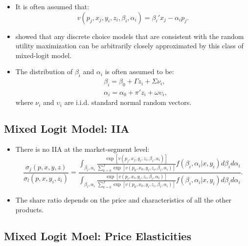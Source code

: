 \documentclass[
]{book}
\providecommand{\tightlist}{%
  \setlength{\itemsep}{0pt}\setlength{\parskip}{0pt}}
\begin{document}
\begin{itemize}
\tightlist
\item
  It is often assumed that:
  \begin{equation}
  v(p_j, x_j, y_i, z_i, \beta_i, \alpha_i) = \beta_i' x_j - \alpha_i p_j.
  \end{equation}
\item
  \citet{Mcfadden2000} showed that any discrete choice models that are consistent with the random utility maximization can be arbitrarily closely approximated by this class of mixed-logit model.
\item
  The distribution of \(\beta_i\) and \(\alpha_i\) is often assumed to be:
  \begin{equation}
  \begin{split}
  &\beta_i = \beta_0 + \Gamma z_i + \Sigma \nu_i,\\
  &\alpha_i = \alpha_0 + \pi' z_i + \omega \upsilon_i,
  \end{split}
  \end{equation}
  where \(\nu_i\) and \(\upsilon_i\) are i.i.d. standard normal random vectors.
\end{itemize}

\hypertarget{mixed-logit-model-iia}{%
\subsection{Mixed Logit Model: IIA}\label{mixed-logit-model-iia}}

\begin{itemize}
\tightlist
\item
  There is no IIA at the market-segment level:
  \begin{equation}
  \frac{\sigma_{j}(p, x, y, z)}{\sigma_{l}(p, x, y_i, z_i)} = \frac{\int_{\beta_i, \alpha_i} \frac{\exp[v(p_j, x_j, y_i, z_i, \beta_i, \alpha_i)]}{\sum_{k = 0}^J \exp[v(p_k, x_k, y_i, z_i, \beta_i, \alpha_i)]} f(\beta_i, \alpha_i|x, y_i) d\beta_i d\alpha_i}{\int_{\beta_i, \alpha_i} \frac{\exp[v(p_l, x_l, y_i, z_i, \beta_i, \alpha_i)]}{\sum_{k = 0}^J \exp[v(p_k, x_k, y_i, z_i, \beta_i, \alpha_i)]} f(\beta_i, \alpha_i|x, y_i) d\beta_i d\alpha_i}.
  \end{equation}
\item
  The share ratio depends on the price and characteristics of all the other products.
\end{itemize}

\hypertarget{mixed-logit-moel-price-elasticities}{%
\subsection{Mixed Logit Moel: Price Elasticities}\label{mixed-logit-moel-price-elasticities}}
\end{document}
